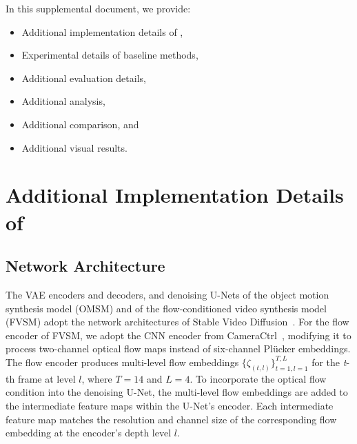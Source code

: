\clearpage
\setcounter{page}{1}
\maketitlesupplementary

\renewcommand{\thefigure}{S\arabic{figure}}
\renewcommand{\thetable}{S\arabic{table}}


In this supplemental document, we provide:
\begin{itemize}
    \item Additional implementation details of \MethodName{},
    \item Experimental details of baseline methods,
    \item Additional evaluation details,
    \item Additional analysis,
    \item Additional comparison, and
    \item Additional visual results.
    
\end{itemize}



\section{Additional Implementation Details of \MethodName{}}
\subsection{Network Architecture}
The VAE encoders and decoders, and denoising U-Nets of the object motion synthesis model (OMSM) and of the flow-conditioned video synthesis model (FVSM) adopt the network architectures of Stable Video Diffusion~\cite{blattmann2023stable}.
For the flow encoder of FVSM, we adopt the CNN encoder from CameraCtrl~\cite{he2024cameractrl}, modifying it to process two-channel optical flow maps instead of six-channel Pl\"{u}cker embeddings.
The flow encoder produces multi-level flow embeddings $\{\zeta_{(t,l)}\}^{T,L}_{t=1,l=1}$ for the \textit{t}-th frame at level $l$, where $T=14$ and $L=4$.
To incorporate the optical flow condition into the denoising U-Net, the multi-level flow embeddings are added to the intermediate feature maps within the U-Net's encoder.
Each intermediate feature map matches the resolution and channel size of the corresponding flow embedding at the encoder's depth level $l$.


